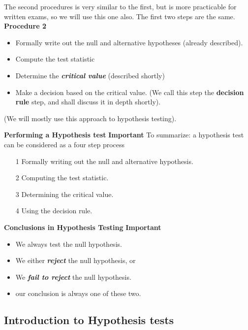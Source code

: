 \documentclass[]{report}
\begin{document}
{%



The second procedures is very similar to the first, but is more practicable for written exams, so we will use this one also. The first two steps are the same.
\textbf{Procedure 2}\\
\begin{itemize}
\item Formally write out the null and alternative hypotheses (already described).
\item Compute the test statistic
\item Determine the \emph{\textbf{critical value}} (described shortly)
\item Make a decision based on the critical value. (We call this step the \textbf{decision rule} step, and shall discuss it in depth shortly).
\end{itemize}
(We will mostly use this approach to hypothesis testing).

\textbf{Performing a Hypothesis test}
\textbf{Important}
To summarize: a hypothesis test can be considered as a four step process
\begin{itemize}
\item [1] Formally writing out the null and alternative hypothesis.
\item [2] Computing the test statistic.
\item [3] Determining the critical value.
\item [4] Using the decision rule.
\end{itemize}



{
\textbf{Conclusions in Hypothesis Testing}
\textbf{Important}
\begin{itemize}
\item  We always test the null hypothesis.
\item  We either \textbf{\emph{reject}} the null hypothesis, or
\item  We \textbf{\emph{ fail to reject}} the null hypothesis.
\item  our conclusion is always one of these two.
\end{itemize}
}



\subsection{Introduction to Hypothesis tests}

}
\end{document}
